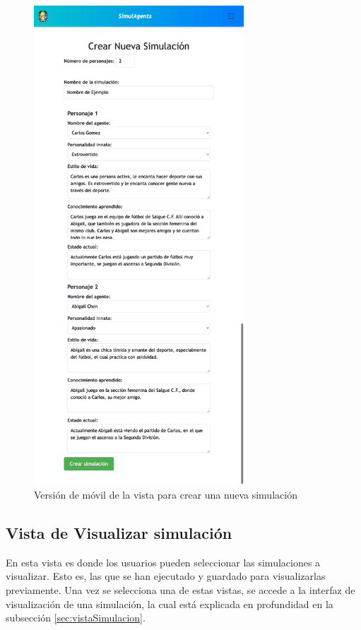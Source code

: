 \begin{figure}[h]
	\centering
	\includegraphics[width = 0.7\textwidth]{Imagenes/Vectorial/crearSimuMobile.png}
	\caption{Versión de móvil de la vista para crear una nueva simulación}
	\label{fig:vistaCrearSimulacionMobile}
\end{figure}

\subsection{Vista de Visualizar simulación}
\label{vistaVisSim}

En esta vista es donde los usuarios pueden seleccionar las simulaciones a visualizar. Esto es, las que se han ejecutado y guardado para visualizarlas previamente. Una vez se selecciona una de estas vistas, se accede a la interfaz de visualización de una simulación, la cual está explicada en profundidad en la subsección  \ref{sec:vistaSimulacion}.

